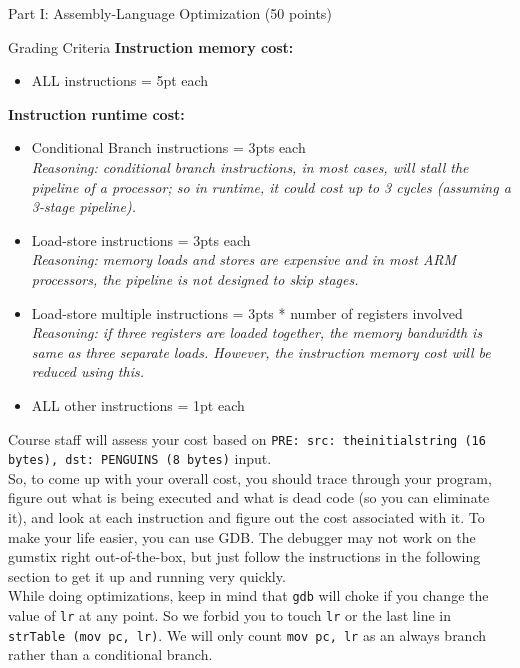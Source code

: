 \documentclass{article}
\begin{document}
\begin{section}{Part I: Assembly-Language Optimization (50 points)}
\begin{subsection}{Grading Criteria}
		 \noindent
        \textbf{Instruction memory cost:}
        \begin{itemize}
          \item ALL instructions = 5pt each
        \end{itemize}

		\noindent
        \textbf{Instruction runtime cost:}
        \begin{itemize}
        \item Conditional Branch instructions = 3pts each \\
        {\em Reasoning: conditional branch instructions, in most cases, will stall the pipeline of a processor; so in runtime, it could cost up to 3 cycles (assuming a 3-stage pipeline).}
        \item Load-store instructions = 3pts each \\
        {\em Reasoning: memory loads and stores are expensive and in most ARM processors, the pipeline is not designed to skip stages.}
        \item Load-store multiple instructions = 3pts * number of registers involved \\
        {\em Reasoning: if three registers are loaded together, the memory bandwidth is same as three separate loads. However, the instruction memory cost will be reduced using this.}
        \item ALL other instructions = 1pt each
        \end{itemize}

        Course staff will assess your cost based on \texttt{PRE: src: theinitialstring (16 bytes), dst: PENGUINS (8 bytes)} input. \\

        So, to come up with your overall cost, you should trace through your program, figure out what is being executed and what is dead code (so you can eliminate it), and look at each instruction and figure out the cost associated with it. To make your life easier, you can use GDB. The debugger may not work on the gumstix right out-of-the-box, but just follow the instructions in the following section to get it up and running very quickly. \\

        While doing optimizations, keep in mind that \texttt{gdb} will choke if you change the value of \texttt{lr} at any point. So we forbid you to touch \texttt{lr} or the last line in \texttt{strTable (mov pc, lr)}. We will only count \texttt{mov pc, lr} as an always branch rather than a conditional branch. \\


\end{subsection}
\end{section}
\end{document}
